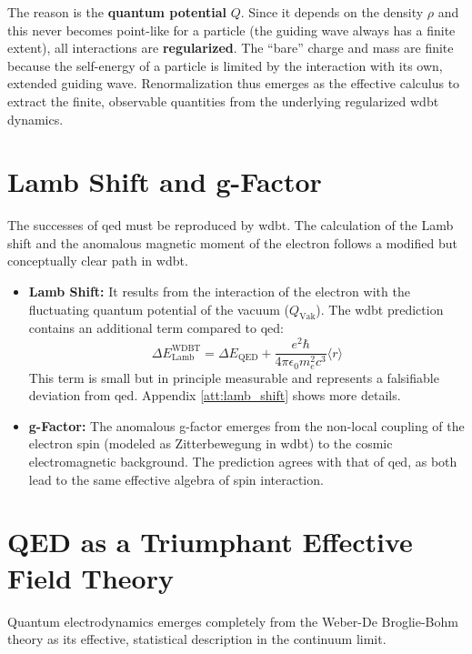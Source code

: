 The reason is the \textbf{quantum potential} $Q$. Since it depends on the density $\rho$ and this never becomes point-like for a particle (the guiding wave always has a finite extent), all interactions are \textbf{regularized}. The \enquote{bare} charge and mass are finite because the self-energy of a particle is limited by the interaction with its own, extended guiding wave. Renormalization thus emerges as the effective calculus to extract the finite, observable quantities from the underlying regularized \gls{wdbt} dynamics.

\section{Lamb Shift and g-Factor}
The successes of \gls{qed} must be reproduced by \gls{wdbt}. The calculation of the Lamb shift and the anomalous magnetic moment of the electron follows a modified but conceptually clear path in \gls{wdbt}.

\begin{itemize}
    \item \textbf{Lamb Shift:} It results from the interaction of the electron with the fluctuating quantum potential of the vacuum ($Q_\text{Vak}$). The \gls{wdbt} prediction contains an additional term compared to \gls{qed}:
    \begin{equation}
        \label{eq:lamb_shift}
        \Delta E_{\text{Lamb}}^{\text{WDBT}} = \Delta E_{\text{QED}} + \frac{e^2 \hbar}{4\pi \epsilon_0 m_e^2 c^3} \langle r \rangle
    \end{equation}
    This term is small but in principle measurable and represents a falsifiable deviation from \gls{qed}. Appendix \ref{att:lamb_shift} shows more details.
    \item \textbf{g-Factor:} The anomalous g-factor emerges from the non-local coupling of the electron spin (modeled as Zitterbewegung in \gls{wdbt}) to the cosmic electromagnetic background. The prediction agrees with that of \gls{qed}, as both lead to the same effective algebra of spin interaction.
\end{itemize}

\section{QED as a Triumphant Effective Field Theory}
Quantum electrodynamics emerges completely from the Weber-De Broglie-Bohm theory as its effective, statistical description in the continuum limit.

